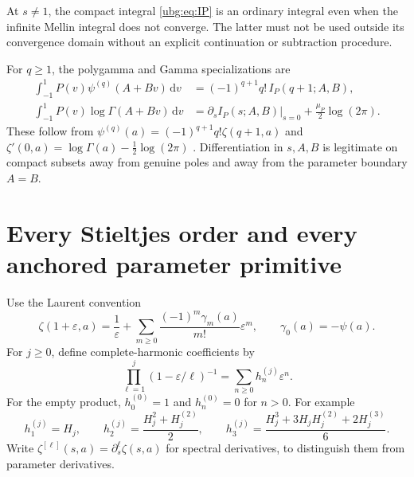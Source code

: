 \documentclass[11pt,letterpaper]{article}
\numberwithin{equation}{section}
\theoremstyle{definition}\newtheorem{definition}[theorem]{Definition}
\theoremstyle{remark}\newtheorem{remark}[theorem]{Remark}
\newcommand{\dd}{\,\mathrm d}\newcommand{\ii}{\mathrm i}
\begin{document}
At $s\ne1$, the compact integral \eqref{ubg:eq:IP} is an ordinary
integral even when the infinite Mellin integral does not converge.
The latter must not be used outside its convergence domain without an
explicit continuation or subtraction procedure.

For $q\ge1$, the polygamma and Gamma specializations are
\begin{align}
 \int_{-1}^1P(v)\psi^{(q)}(A+Bv)\dd v
       &=(-1)^{q+1}q!\,I_P(q+1;A,B),\label{ubg:eq:psi-transform}\\
 \int_{-1}^1P(v)\log\Gamma(A+Bv)\dd v
       &=\left.\partial_s I_P(s;A,B)\right|_{s=0}
                                      +\frac{\mu_P}{2}\log(2\pi).
 \label{ubg:eq:Gamma-transform}
\end{align}
These follow from
$\psi^{(q)}(a)=(-1)^{q+1}q!\zeta(q+1,a)$ and
$\zeta'(0,a)=\log\Gamma(a)-\tfrac12\log(2\pi)$
\cite{DLMFpsi,DLMFzeta}. Differentiation in $s,A,B$ is legitimate on
compact subsets away from genuine poles and away from the parameter
boundary $A=B$.

\section{Every Stieltjes order and every anchored parameter primitive}
\label{ubg:sec:Stieltjes}

Use the Laurent convention
\begin{equation}\label{ubg:eq:Stieltjes-convention}
 \zeta(1+\varepsilon,a)=\frac1\varepsilon+
      \sum_{m\ge0}\frac{(-1)^m\gamma_m(a)}{m!}\varepsilon^m,
 \qquad \gamma_0(a)=-\psi(a).
\end{equation}
For $j\ge0$, define complete-harmonic coefficients by
\begin{equation}\label{ubg:eq:hj}
 \prod_{\ell=1}^j(1-\varepsilon/\ell)^{-1}
     =\sum_{n\ge0}h_n^{(j)}\varepsilon^n.
\end{equation}
For the empty product, $h_0^{(0)}=1$ and $h_n^{(0)}=0$ for $n>0$.
For example
\[
 h_1^{(j)}=H_j,\qquad
 h_2^{(j)}=\frac{H_j^2+H_j^{(2)}}2,\qquad
 h_3^{(j)}=\frac{H_j^3+3H_jH_j^{(2)}+2H_j^{(3)}}6.
\]
Write $\zeta^{[\ell]}(s,a)=\partial_s^\ell\zeta(s,a)$ for spectral
derivatives, to distinguish them from parameter derivatives.
\end{document}
